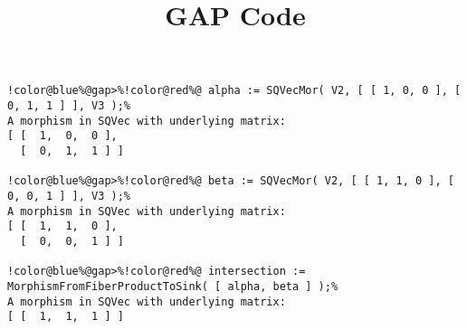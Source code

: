 \documentclass[12pt]{amsart}
\title{GAP Code}
\author{}
\begin{document}
\maketitle

\begin{Verbatim}[commandchars=!@\%,frame=single]
!color@blue%@gap>%!color@red%@ alpha := SQVecMor( V2, [ [ 1, 0, 0 ], [ 0, 1, 1 ] ], V3 );%
A morphism in SQVec with underlying matrix:
[ [  1,  0,  0 ],
  [  0,  1,  1 ] ]

!color@blue%@gap>%!color@red%@ beta := SQVecMor( V2, [ [ 1, 1, 0 ], [ 0, 0, 1 ] ], V3 );%
A morphism in SQVec with underlying matrix:
[ [  1,  1,  0 ],
  [  0,  0,  1 ] ]

!color@blue%@gap>%!color@red%@ intersection := MorphismFromFiberProductToSink( [ alpha, beta ] );%
A morphism in SQVec with underlying matrix:
[ [  1,  1,  1 ] ]

\end{Verbatim}
\end{document}
